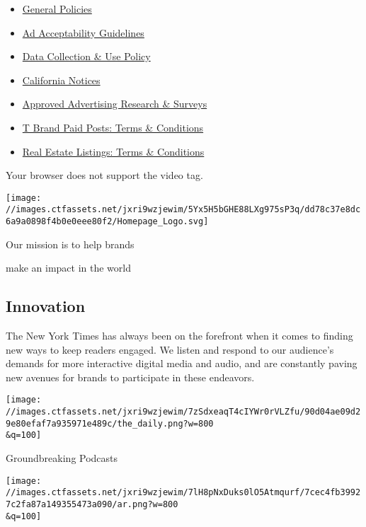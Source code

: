 \begin{itemize}
  \begin{itemize}
  \tightlist
  \item
    \href{/general-resources?id=general-policies}{General Policies}
  \item
    \href{/general-resources?id=ad-acceptability-guidelines}{Ad
    Acceptability Guidelines}
  \item
    \href{/general-resources?id=data-collection-and-use}{Data Collection
    \& Use Policy}
  \item
    \href{/http:/www.nytimes.com/privacy/california-notice}{California
    Notices}
  \item
    \href{/general-resources?id=approved-advertising-research-and-surveys}{Approved
    Advertising Research \& Surveys}
  \item
    \href{/general-resources?id=t-brand-paid-post-terms}{T Brand Paid
    Posts: Terms \& Conditions}
  \item
    \href{/general-resources?id=real-estate-listings-terms-and-conditions}{Real
    Estate Listings: Terms \& Conditions}
  \end{itemize}
\end{itemize}

Your browser does not support the video tag.

\texttt{[image: //images.ctfassets.net/jxri9wzjewim/5Yx5H5bGHE88LXg975sP3q/dd78c37e8dc6a9a0898f4b0e0eee80f2/Homepage\_Logo.svg]}

Our mission is to help brands

make an impact in the world

\hypertarget{innovation}{%
\subsection{Innovation}\label{innovation}}

The New York Times has always been on the forefront when it comes to
finding new ways to keep readers engaged. We listen and respond to our
audience's demands for more interactive digital media and audio, and are
constantly paving new avenues for brands to participate in these
endeavors.

\texttt{[image: //images.ctfassets.net/jxri9wzjewim/7zSdxeaqT4cIYWr0rVLZfu/90d04ae09d29e80efaf7a935971e489c/the\_daily.png?w=800\\\&q=100]}

Groundbreaking Podcasts

\texttt{[image: //images.ctfassets.net/jxri9wzjewim/7lH8pNxDuks0lO5Atmqurf/7cec4fb39927c2fa87a149355473a090/ar.png?w=800\\\&q=100]}

